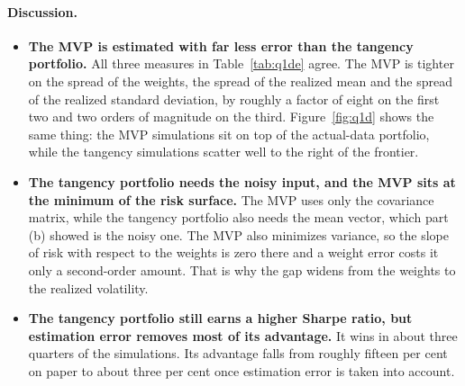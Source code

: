 \documentclass[11pt]{article}
\begin{document}
\paragraph{Discussion.}
\begin{itemize}
\setlength{\itemsep}{6pt}\setlength{\parskip}{0pt}

\item \textbf{The MVP is estimated with far less error than the tangency
portfolio.} All three measures in Table~\ref{tab:q1de} agree. The MVP is
tighter on the spread of the weights, the spread of the realized mean and the
spread of the realized standard deviation, by roughly a factor of eight on the
first two and two orders of magnitude on the third. Figure~\ref{fig:q1d} shows
the same thing: the MVP simulations sit on top of the actual-data portfolio,
while the tangency simulations scatter well to the right of the frontier.

\item \textbf{The tangency portfolio needs the noisy input, and the MVP sits
at the minimum of the risk surface.} The MVP uses only the covariance matrix,
while the tangency portfolio also needs the mean vector, which part (b) showed
is the noisy one. The MVP also minimizes variance, so the slope of risk with
respect to the weights is zero there and a weight error costs it only a
second-order amount. That is why the gap widens from the weights to the
realized volatility.

\item \textbf{The tangency portfolio still earns a higher Sharpe ratio, but
estimation error removes most of its advantage.} It wins in about three
quarters of the simulations. Its advantage falls from roughly fifteen per cent
on paper to about three per cent once estimation error is taken into account.

\end{itemize}
\end{document}
